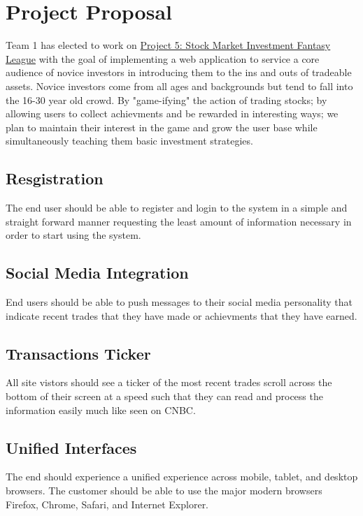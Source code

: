 \documentclass[11pt,letterpaper,oneside]{memoir}
\begin{document}
\chapter{Project Proposal}
\label{proposal}
Team 1 has elected to work on \href{http://ece.rutgers.edu/~marsic/books/SE/projects/}
{Project 5: Stock Market Investment Fantasy League} with the goal of implementing a
web application to service a core audience of novice investors in introducing them to
the ins and outs of tradeable assets.  Novice investors come from all ages and backgrounds
but tend to fall into the 16-30 year old crowd.  By "game-ifying" the action of trading
stocks; by allowing users to collect achievments and be rewarded in interesting ways; we
plan to maintain their interest in the game and grow the user base while simultaneously
teaching them basic investment strategies.

\section{Resgistration}

The end user should be able to register and login to the system in a simple and straight forward
manner requesting the least amount of information necessary in order to start using the system.

\section{Social Media Integration}

End users should be able to push messages to their social media personality that indicate
recent trades that they have made or achievments that they have earned.

\section{Transactions Ticker}

All site vistors should see a ticker of the most recent trades scroll across the bottom of their
screen at a speed such that they can read and process the information easily much like seen on
CNBC.

\section{Unified Interfaces}

The end should experience a unified experience across mobile, tablet, and desktop browsers.
The customer should be able to use the major modern browsers Firefox, Chrome, Safari, and
Internet Explorer.
\end{document}
